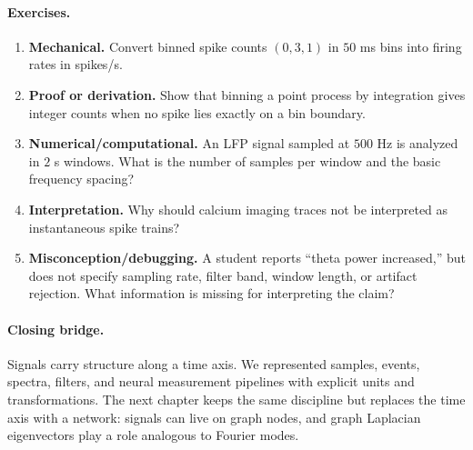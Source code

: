 \paragraph{Exercises.}
\begin{enumerate}[label=\textbf{28.4.\arabic*.}, leftmargin=*]
\item \textbf{Mechanical.} Convert binned spike counts \((0,3,1)\) in \(50\) ms bins into firing rates in spikes/s.
\item \textbf{Proof or derivation.} Show that binning a point process by integration gives integer counts when no spike lies exactly on a bin boundary.
\item \textbf{Numerical/computational.} An LFP signal sampled at \(500\) Hz is analyzed in \(2\) s windows. What is the number of samples per window and the basic frequency spacing?
\item \textbf{Interpretation.} Why should calcium imaging traces not be interpreted as instantaneous spike trains?
\item \textbf{Misconception/debugging.} A student reports ``theta power increased,'' but does not specify sampling rate, filter band, window length, or artifact rejection. What information is missing for interpreting the claim?
\end{enumerate}

\paragraph{Closing bridge.}
Signals carry structure along a time axis. We represented samples, events, spectra, filters, and neural measurement pipelines with explicit units and transformations. The next chapter keeps the same discipline but replaces the time axis with a network: signals can live on graph nodes, and graph Laplacian eigenvectors play a role analogous to Fourier modes.

\clearpage
